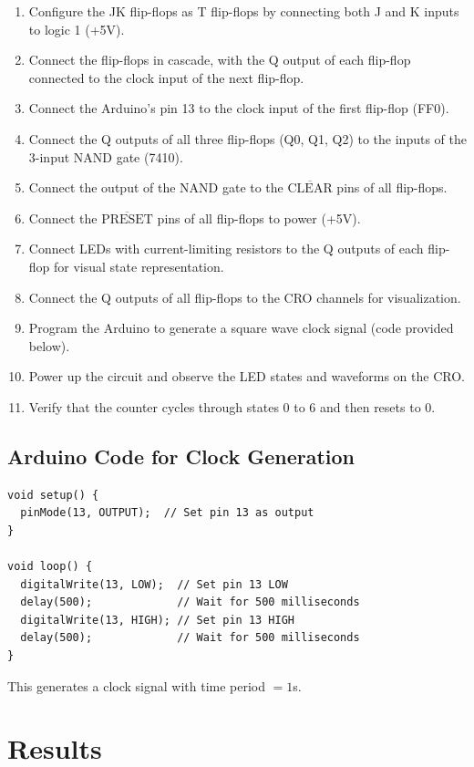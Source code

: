 \documentclass[12pt]{article}
\begin{document}
\begin{enumerate}
    \item Configure the JK flip-flops as T flip-flops by connecting both J and K inputs to logic 1 (+5V).
    \item Connect the flip-flops in cascade, with the Q output of each flip-flop connected to the clock input of the next flip-flop.
    \item Connect the Arduino's pin 13 to the clock input of the first flip-flop (FF0).
    \item Connect the Q outputs of all three flip-flops (Q0, Q1, Q2) to the inputs of the 3-input NAND gate (7410).
    \item Connect the output of the NAND gate to the $\overline{\text{CLEAR}}$ pins of all flip-flops.
    \item Connect the $\overline{\text{PRESET}}$ pins of all flip-flops to power (+5V).
    \item Connect LEDs with current-limiting resistors to the Q outputs of each flip-flop for visual state representation.
    \item Connect the Q outputs of all flip-flops to the CRO channels for visualization.
    \item Program the Arduino to generate a square wave clock signal (code provided below).
    \item Power up the circuit and observe the LED states and waveforms on the CRO.
    \item Verify that the counter cycles through states 0 to 6 and then resets to 0.
\end{enumerate}

\subsection{Arduino Code for Clock Generation}
\begin{verbatim}
void setup() {
  pinMode(13, OUTPUT);  // Set pin 13 as output
}

void loop() {
  digitalWrite(13, LOW);  // Set pin 13 LOW
  delay(500);             // Wait for 500 milliseconds
  digitalWrite(13, HIGH); // Set pin 13 HIGH
  delay(500);             // Wait for 500 milliseconds
}
\end{verbatim}
\FloatBarrier

This generates a clock signal with time period $= 1$s.

\section{Results}
\end{document}
